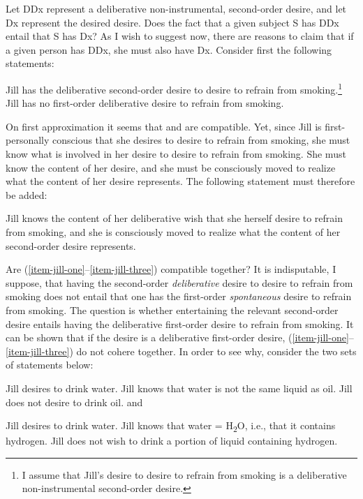 \documentclass[output=paper]{langscibook}
\begin{document}
Let DDx represent a deliberative non-instrumental, second-order desire, and let Dx represent the desired desire. Does the fact that a given subject S has DDx entail that S has Dx? As I wish to suggest now, there are reasons to claim that if a given person has DDx, she must also have Dx.
Consider first the following statements:

\ea \label{item-jill-one}Jill has the deliberative second-order desire to desire to refrain from smoking.\footnote{I assume that Jill's desire to desire to refrain from smoking is a deliberative non-instrumental second-order desire.}
\ex\label{item-jill-two}Jill has no first-order deliberative desire to refrain from smoking. 
\z

On first approximation it seems that  and  are compatible. Yet, since Jill is first-personally conscious that she desires to desire to refrain from smoking, she must know what is involved in her desire to desire to refrain from smoking. She must know the content of her desire, and she must be consciously moved to realize what the content of her desire represents. The following statement must therefore be added: 

\ea\label{item-jill-three}	Jill knows the content of her deliberative wish that she herself desire to refrain from smoking, and she is consciously moved to realize what the content of her second-order desire represents. 
\z

Are (\ref{item-jill-one}--\ref{item-jill-three}) compatible together? It is indisputable, I suppose, that having the second-order \textit{deliberative} desire to desire to refrain from smoking does not entail that one has the first-order \textit{spontaneous} desire to refrain from smoking. The question is whether entertaining the relevant second-order desire entails having the deliberative first-order desire to refrain from smoking. It can be shown that if the desire is a deliberative first-order desire, (\ref{item-jill-one}--\ref{item-jill-three}) do not cohere together. In order to see why, consider the two sets of statements below:

\ea\label{item-jill-four}	Jill desires to drink water.
\ex\label{item-jill5}	Jill knows that water is not the same liquid as oil. 
\ex\label{item-jill-six}	Jill does not desire to drink oil.
\z
\noindent
and

\ea\label{item-jill-seven}	Jill desires to drink water.
\ex\label{item-jill8}	Jill knows that water = H\textsubscript{2}O, i.e., that it contains hydrogen.
\ex\label{item-jill-nine}	Jill does not wish to drink a portion of liquid containing hydrogen.
\z
\end{document}
